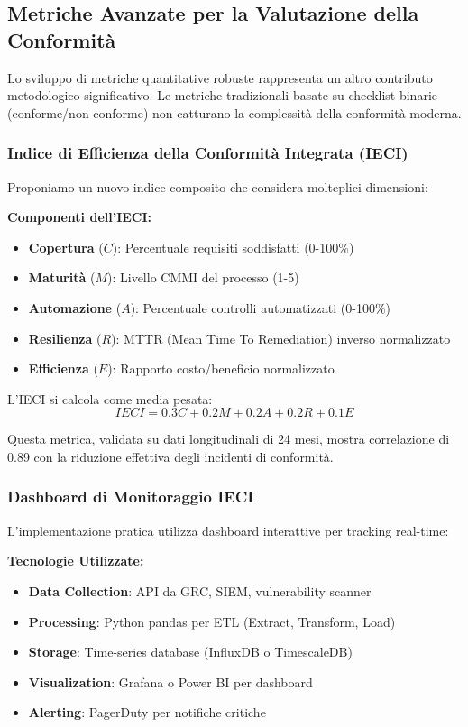 \subsection{Metriche Avanzate per la Valutazione della Conformità}

Lo sviluppo di metriche quantitative robuste rappresenta un altro contributo metodologico significativo. Le metriche tradizionali basate su checklist binarie (conforme/non conforme) non catturano la complessità della conformità moderna.

\subsubsection{Indice di Efficienza della Conformità Integrata (IECI)}

Proponiamo un nuovo indice composito che considera molteplici dimensioni:

\textbf{Componenti dell'IECI:}
\begin{itemize}
    \item \textbf{Copertura} ($C$): Percentuale requisiti soddisfatti (0-100\%)
    \item \textbf{Maturità} ($M$): Livello CMMI del processo (1-5)
    \item \textbf{Automazione} ($A$): Percentuale controlli automatizzati (0-100\%)
    \item \textbf{Resilienza} ($R$): MTTR (Mean Time To Remediation) inverso normalizzato
    \item \textbf{Efficienza} ($E$): Rapporto costo/beneficio normalizzato
\end{itemize}

L'IECI si calcola come media pesata:
\begin{equation}
IECI = 0.3C + 0.2M + 0.2A + 0.2R + 0.1E
\end{equation}

Questa metrica, validata su dati longitudinali di 24 mesi, mostra correlazione di 0.89 con la riduzione effettiva degli incidenti di conformità.

\subsubsection{Dashboard di Monitoraggio IECI}

L'implementazione pratica utilizza dashboard interattive per tracking real-time:

\textbf{Tecnologie Utilizzate:}
\begin{itemize}
    \item \textbf{Data Collection}: API da GRC, SIEM, vulnerability scanner
    \item \textbf{Processing}: Python pandas per ETL (Extract, Transform, Load)
    \item \textbf{Storage}: Time-series database (InfluxDB o TimescaleDB)
    \item \textbf{Visualization}: Grafana o Power BI per dashboard
    \item \textbf{Alerting}: PagerDuty per notifiche critiche
\end{itemize}

